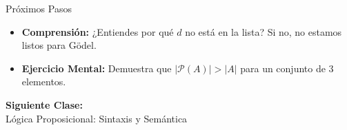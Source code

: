 \documentclass[10pt, aspectratio=169]{beamer}
\begin{document}
\begin{frame}{Próximos Pasos}
    \begin{itemize}
        \item \textbf{Comprensión:} ¿Entiendes por qué $d$ no está en la lista? Si no, no estamos listos para Gödel.
        \item \textbf{Ejercicio Mental:} Demuestra que $|\mathcal{P}(A)| > |A|$ para un conjunto de 3 elementos.
    \end{itemize}
    \vspace{0.8cm}
    \centering \Large \textbf{Siguiente Clase:} \\ \normalsize Lógica Proposicional: Sintaxis y Semántica
\end{frame}
\end{document}
